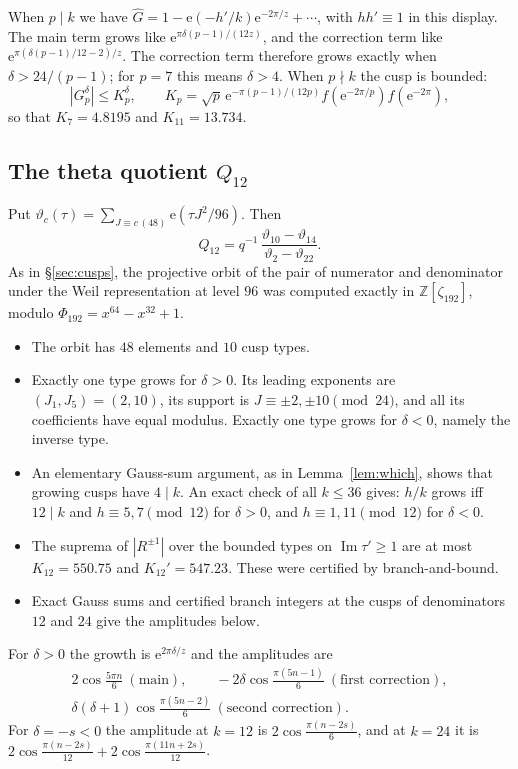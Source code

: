 \documentclass[11pt]{amsart}
\theoremstyle{remark}
\theoremstyle{definition}
\newcommand{\Z}{\mathbb Z}
\newcommand{\Ima}{\operatorname{Im}}
\newcommand{\e}{\mathrm e}
\begin{document}
When $p\mid k$ we have $\widehat G=1-\e(-h'/k)\e^{-2\pi/z}+\cdots$, with $hh'\equiv1$ in this display. The main term grows like $\e^{\pi\delta(p-1)/(12z)}$, and the correction term like $\e^{\pi(\delta(p-1)/12-2)/z}$. The correction term therefore grows exactly when $\delta>24/(p-1)$; for $p=7$ this means $\delta>4$. When $p\nmid k$ the cusp is bounded:
\[
|G_p^\delta|\le K_p^\delta,\qquad K_p=\sqrt p\,\e^{-\pi(p-1)/(12p)}f(\e^{-2\pi/p})f(\e^{-2\pi}),
\]
so that $K_7=4.8195$ and $K_{11}=13.734$.

\subsection{The theta quotient $Q_{12}$}
Put $\vartheta_c(\tau)=\sum_{J\equiv c\,(48)}\e(\tau J^2/96)$. Then
\[
Q_{12}=q^{-1}\,\frac{\vartheta_{10}-\vartheta_{14}}{\vartheta_2-\vartheta_{22}}.
\]
As in \S\ref{sec:cusps}, the projective orbit of the pair of numerator and denominator under the Weil representation at level $96$ was computed exactly in $\Z[\zeta_{192}]$, modulo $\Phi_{192}=x^{64}-x^{32}+1$.
\begin{itemize}[leftmargin=2em]
\item The orbit has $48$ elements and $10$ cusp types.
\item Exactly one type grows for $\delta>0$. Its leading exponents are $(J_1,J_5)=(2,10)$, its support is $J\equiv\pm2,\pm10\pmod{24}$, and all its coefficients have equal modulus. Exactly one type grows for $\delta<0$, namely the inverse type.
\item An elementary Gauss-sum argument, as in Lemma~\ref{lem:which}, shows that growing cusps have $4\mid k$. An exact check of all $k\le36$ gives: $h/k$ grows iff $12\mid k$ and $h\equiv5,7\pmod{12}$ for $\delta>0$, and $h\equiv1,11\pmod{12}$ for $\delta<0$.
\item The suprema of $|R^{\pm1}|$ over the bounded types on $\Ima\tau'\ge1$ are at most $K_{12}=550.75$ and $K_{12}'=547.23$. These were certified by branch-and-bound.
\item Exact Gauss sums and certified branch integers at the cusps of denominators $12$ and $24$ give the amplitudes below.
\end{itemize}
For $\delta>0$ the growth is $\e^{2\pi\delta/z}$ and the amplitudes are
\[
\begin{gathered}2\cos\tfrac{5\pi n}6\ (\text{main}),\qquad -2\delta\cos\tfrac{\pi(5n-1)}6\ (\text{first correction}),\\ \delta(\delta+1)\cos\tfrac{\pi(5n-2)}6\ (\text{second correction}).\end{gathered}
\]
For $\delta=-s<0$ the amplitude at $k=12$ is $2\cos\frac{\pi(n-2s)}6$, and at $k=24$ it is $2\cos\frac{\pi(n-2s)}{12}+2\cos\frac{\pi(11n+2s)}{12}$.
\end{document}
